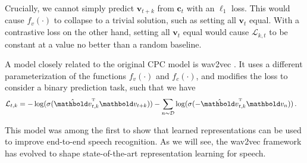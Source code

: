 Crucially, we cannot simply predict $\mathbf{v}_{t+k}$ from $\mathbf{c}_t$ with an $\ell_1$ loss. This would cause $f_v(\cdot)$ to collapse to a trivial solution, such as setting all $\mathbf{v}_t$ equal. With a contrastive loss on the other hand, setting all $\mathbf{v}_t$ equal would cause $\mathcal{L}_{k,t}$ to be constant at a value no better than a random baseline. 

A model closely related to the original CPC model is wav2vec \cite{schneider2019wav2vec}. It uses a different parameterization of the functions $f_v(\cdot)$ and $f_c(\cdot)$, and modifies the loss to consider a binary prediction task, such that we have
%
\begin{align}
    \mathcal{L}_{t,k} &= - \log(\sigma(\hat{\mathbf{v}}_{t,k}^{\text{\tiny T}}\mathbf{v}_{t+k})) - \sum_{n \sim \mathcal{D}} \log(\sigma(-\hat{\mathbf{v}}_{t,k}^{\text{\tiny T}}\mathbf{v}_{n})) \,.
    \label{eq: wav2vec loss}
\end{align}

\noindent This model was among the first to show that learned representations can be used to improve end-to-end speech recognition. As we will see, the wav2vec framework has evolved to shape state-of-the-art representation learning for speech.


